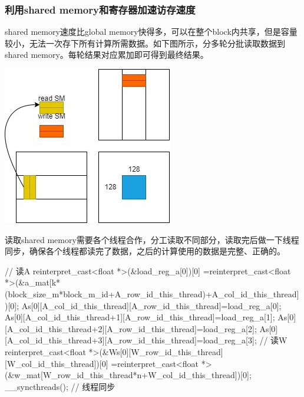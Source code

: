 \documentclass[UTF8,10pt]{ctexart}
\begin{document}
\subsubsection{利用shared memory和寄存器加速访存速度}
shared memory速度比global memory快得多，可以在整个block内共享，但是容量较小，无法一次存下所有计算所需数据。如下图所示，分多轮分批读取数据到shared memory。每轮结果对应累加即可得到最终结果。
\begin{center}
\includegraphics[scale=0.7]{img/3.jpg}
\end{center}

读取shared memory需要各个线程合作，分工读取不同部分，读取完后做一下线程同步，确保各个线程都读完了数据，之后的计算使用的数据是完整、正确的。

\begin{python}
// 读A
reinterpret_cast<float *>(&load_reg_a[0])[0]
=reinterpret_cast<float *>(&a_mat[k*(block_size_m*block_m_id+A_row_id_this_thread)+A_col_id_this_thread])[0];
As[0][A_col_id_this_thread][A_row_id_this_thread]=load_reg_a[0];
As[0][A_col_id_this_thread+1][A_row_id_this_thread]=load_reg_a[1];
As[0][A_col_id_this_thread+2][A_row_id_this_thread]=load_reg_a[2];
As[0][A_col_id_this_thread+3][A_row_id_this_thread]=load_reg_a[3];
// 读W
reinterpret_cast<float *>(&Ws[0][W_row_id_this_thread][W_col_id_this_thread])[0]
=reinterpret_cast<float *>(&w_mat[W_row_id_this_thread*n+W_col_id_this_thread])[0];
__syncthreads();    // 线程同步
\end{python}
\end{document}

